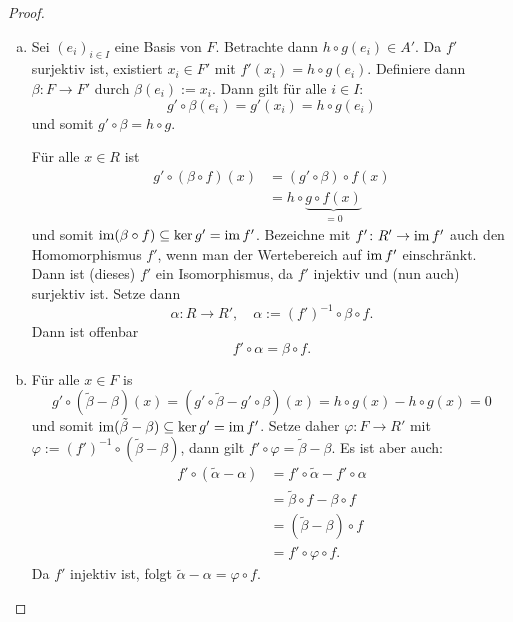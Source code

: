 \begin{proof}
  \begin{enumerate}[(a)]
    \item 
      Sei ${(e_i)}_{i \in I}$ eine Basis von $F$.
      Betrachte dann $h \circ g (e_i) \in A'$.
      Da $f'$ surjektiv ist, existiert $x_i \in F'$ mit $f'(x_i) = h \circ g(e_i)$.
      Definiere dann $\beta \colon F \to F'$ durch $\beta(e_i) := x_i$.
      Dann gilt für alle $i \in I$:
      \begin{equation*}
        g' \circ \beta(e_i) = g'(x_i) = h \circ g(e_i)
      \end{equation*}
      und somit $g' \circ \beta = h \circ g$.

      Für alle $x \in R$ ist
      \begin{align*}
        g' \circ (\beta \circ f) (x)
          & = (g' \circ \beta) \circ f (x) \\
          & = h \circ \underset{=0}{\underbrace{g \circ f(x)}}
      \end{align*}
      und somit $\operatorname{im} (\beta \circ f) \subseteq  \ker g' = \operatorname{im} f'$.
      Bezeichne mit $f'\colon R' \to \operatorname{im} f'$ auch den Homomorphismus $f'$, wenn man der Wertebereich auf $\operatorname{im} f'$ einschränkt.
      Dann ist (dieses) $f'$ ein Isomorphismus, da $f'$ injektiv und (nun auch) surjektiv ist.
      Setze dann
      \[
        \alpha \colon R \to R',\quad \alpha := {(f')}^{-1} \circ \beta \circ f.
      \]
      Dann ist offenbar
      \begin{equation*}
        f' \circ \alpha = \beta \circ f.
      \end{equation*}
    \item
      Für  alle $x \in F$ is
      \begin{equation*}
        g' \circ (\tilde\beta - \beta) (x) = (g' \circ \tilde \beta - g' \circ \beta) (x) = h\circ g(x) - h \circ g(x) = 0
      \end{equation*}
      und somit $\operatorname{im} (\tilde\beta - \beta) \subseteq \ker g' = \operatorname{im} f'$.
      Setze daher $\varphi \colon F \to R'$ mit $\varphi := {(f')}^{-1} \circ (\tilde \beta - \beta)$, dann gilt $f' \circ \varphi = \tilde \beta - \beta$.
      Es ist aber auch:
      \begin{align*}
        f' \circ (\tilde\alpha - \alpha)
          & = f' \circ \tilde \alpha - f' \circ \alpha \\
          & = \tilde \beta \circ f - \beta \circ f \\
          & = (\tilde \beta - \beta) \circ f \\
          & = f' \circ \varphi \circ f.
      \end{align*}
      Da $f'$ injektiv ist, folgt $\tilde \alpha - \alpha = \varphi \circ f$.
  \end{enumerate}
\end{proof}
